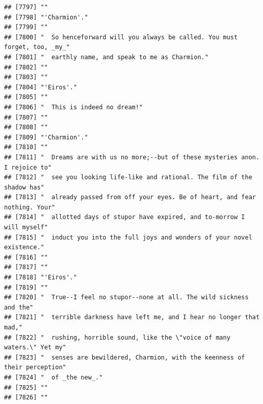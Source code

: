 \documentclass{article}\usepackage[]{graphicx}\usepackage[]{color}
\makeatletter
\newenvironment{kframe}{%
 \def\at@end@of@kframe{}%
 \ifinner\ifhmode%
  \def\at@end@of@kframe{\end{minipage}}%
  \begin{minipage}{\columnwidth}%
 \fi\fi%
 \def\FrameCommand##1{\hskip\@totalleftmargin \hskip-\fboxsep
 \colorbox{shadecolor}{##1}\hskip-\fboxsep
     \hskip-\linewidth \hskip-\@totalleftmargin \hskip\columnwidth}%
 \MakeFramed {\advance\hsize-\width
   \@totalleftmargin\z@ \linewidth\hsize
   \@setminipage}}%
 {\par\unskip\endMakeFramed%
 \at@end@of@kframe}
\newenvironment{knitrout}{}{} %
\makeatother
\begin{document}
\begin{knitrout}
\begin{kframe}
\begin{verbatim}
## [7797] ""                                                                            
## [7798] "'Charmion'."                                                                 
## [7799] ""                                                                            
## [7800] "  So henceforward will you always be called. You must forget, too, _my_"     
## [7801] "  earthly name, and speak to me as Charmion."                                
## [7802] ""                                                                            
## [7803] ""                                                                            
## [7804] "'Eiros'."                                                                    
## [7805] ""                                                                            
## [7806] "  This is indeed no dream!"                                                  
## [7807] ""                                                                            
## [7808] ""                                                                            
## [7809] "'Charmion'."                                                                 
## [7810] ""                                                                            
## [7811] "  Dreams are with us no more;--but of these mysteries anon. I rejoice to"    
## [7812] "  see you looking life-like and rational. The film of the shadow has"        
## [7813] "  already passed from off your eyes. Be of heart, and fear nothing. Your"    
## [7814] "  allotted days of stupor have expired, and to-morrow I will myself"         
## [7815] "  induct you into the full joys and wonders of your novel existence."        
## [7816] ""                                                                            
## [7817] ""                                                                            
## [7818] "'Eiros'."                                                                    
## [7819] ""                                                                            
## [7820] "  True--I feel no stupor--none at all. The wild sickness and the"            
## [7821] "  terrible darkness have left me, and I hear no longer that mad,"            
## [7822] "  rushing, horrible sound, like the \"voice of many waters.\" Yet my"        
## [7823] "  senses are bewildered, Charmion, with the keenness of their perception"    
## [7824] "  of _the new_."                                                             
## [7825] ""                                                                            
## [7826] ""                                                                            

\end{verbatim}
\end{kframe}
\end{knitrout}
\end{document}

